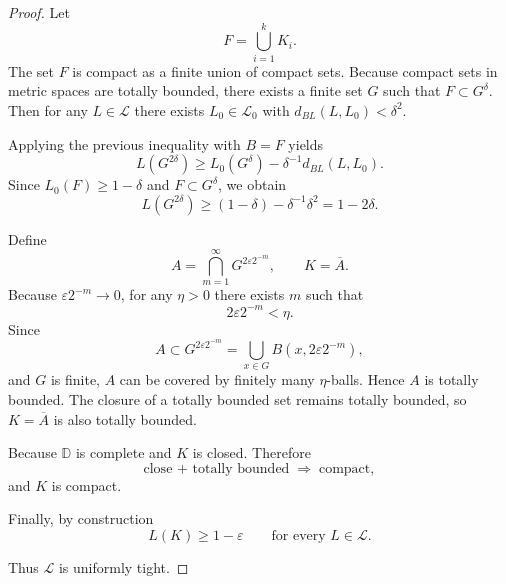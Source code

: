 \documentclass[12pt]{article}
\renewcommand{\(}{\left(}%
\renewcommand{\)}{\right)}%
\renewcommand{\[}{\left[}%
\renewcommand{\]}{\right]}%
\newtheorem{proof}{Proof.}}
\begin{document}
\begin{proof}
Let
\begin{equation*}
F=\bigcup_{i=1}^k K_i .
\end{equation*}
The set $F$ is compact as a finite union of compact sets.  
Because compact sets in metric spaces are totally bounded, there exists a finite set $G$ such that $F \subset G^\delta.$
Then for any $L\in\mathscr L$ there exists $L_0\in\mathscr L_0$ with $d_{BL}(L,L_0)<\delta^2 .$

Applying the previous inequality with $B=F$ yields
\begin{equation*}
L(G^{2\delta}) \ge L_0(G^\delta) - \delta^{-1}d_{BL}(L,L_0).
\end{equation*}
Since $L_0(F)\ge1-\delta$ and $F\subset G^\delta$, we obtain
\begin{equation*}
L(G^{2\delta})\ge (1-\delta)-\delta^{-1} \delta^{2} =1-2\delta .
\end{equation*}

\medskip

Define
\begin{equation*}
A=\bigcap_{m=1}^{\infty} G^{2\varepsilon 2^{-m}},
\qquad
K=\overline{A}.
\end{equation*}
Because $\varepsilon2^{-m}\to0$, for any $\eta>0$ there exists $m$ such that
\begin{equation*}
2\varepsilon2^{-m}<\eta .
\end{equation*}
Since
\begin{equation*}
A \subset G^{2\varepsilon2^{-m}}
= \bigcup_{x\in G} B(x,2\varepsilon2^{-m}),
\end{equation*}
and $G$ is finite, $A$ can be covered by finitely many $\eta$-balls. Hence $A$ is totally bounded.  
The closure of a totally bounded set remains totally bounded, so $K=\overline A$ is also totally bounded.

Because $\mathbb D$ is complete and $K$ is closed. Therefore
\begin{equation*}
\text{close + totally bounded} \;\Rightarrow\; \text{compact},
\end{equation*}
and $K$ is compact.

Finally, by construction
\begin{equation*}
L(K)\ge 1-\varepsilon
\qquad \text{for every } L\in\mathscr L.
\end{equation*}

Thus $\mathscr L$ is uniformly tight.

\end{proof}
\end{document}
